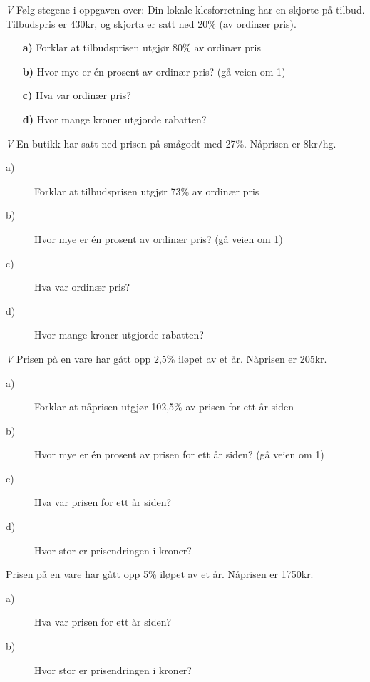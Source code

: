 \documentclass[a4, 11pt, twoside]{article}
\theoremstyle{definition}
\begin{document}
\begin{Exercise}
\textit{V}\newline
Følg stegene i oppgaven over: \newline
Din lokale klesforretning har en skjorte på tilbud. Tilbudspris er
430kr, og skjorta er satt ned 20\% (av ordinær pris).
\begin{itemize}
\item[\bf a)] Forklar at tilbudsprisen utgjør 80\% av ordinær pris
\item[\bf b)] Hvor mye er én prosent av ordinær pris? (gå veien om 1)
\item[\bf c)] Hva var ordinær pris?
\item[\bf d)] Hvor mange kroner utgjorde rabatten?
\end{itemize}
\end{Exercise}

\begin{Exercise}
\textit{V}\newline
  En butikk har satt ned prisen på smågodt med 27\%. Nåprisen er 8kr/hg.
\begin{description}
\item[a)] Forklar at tilbudsprisen utgjør 73\% av ordinær pris
\item[b)] Hvor mye er én prosent av ordinær pris? (gå veien om 1)
\item[c)] Hva var ordinær pris?
\item[d)] Hvor mange kroner utgjorde rabatten?
\end{description}
\end{Exercise}

\begin{Exercise}
\textit{V}\newline
  Prisen på en vare har gått opp 2,5\% iløpet av et år. Nåprisen er 205kr.
\begin{description}
\item[a)] Forklar at nåprisen utgjør 102,5\% av prisen for ett år siden
\item[b)] Hvor mye er én prosent av prisen for ett år siden? (gå veien om 1)
\item[c)] Hva var prisen for ett år siden?
\item[d)] Hvor stor er prisendringen i kroner?
\end{description}
\end{Exercise}

\begin{Exercise}
  Prisen på en vare har gått opp 5\% iløpet av et år. Nåprisen er 1750kr.
\begin{description}
\item[a)] Hva var prisen for ett år siden?
\item[b)] Hvor stor er prisendringen i kroner?
\end{description}
\end{Exercise}
\end{document}

